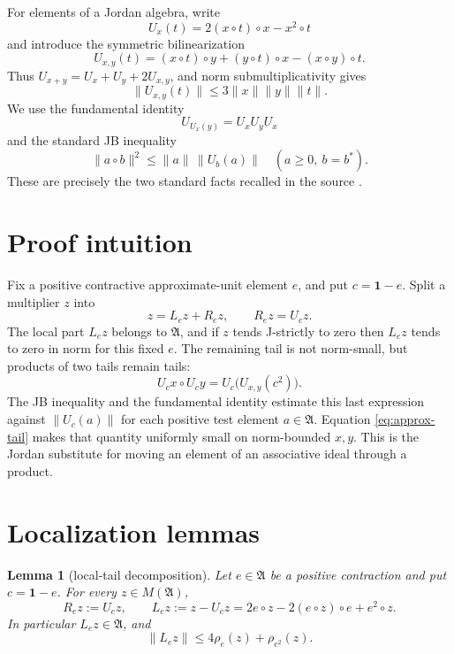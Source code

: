 \documentclass[11pt]{article}
\newtheorem{lemma}[theorem]{Lemma}
\newcommand{\A}{\mathfrak A}
\newcommand{\M}{M(\mathfrak A)}
\newcommand{\one}{\mathbf 1}
\begin{document}
For elements of a Jordan algebra, write
\[
 U_x(t)=2(x\circ t)\circ x-x^2\circ t
\]
and introduce the symmetric bilinearization
\[
 U_{x,y}(t)
 =(x\circ t)\circ y+(y\circ t)\circ x-(x\circ y)\circ t.
\]
Thus \(U_{x+y}=U_x+U_y+2U_{x,y}\), and norm
submultiplicativity gives
\begin{equation}\label{eq:bilinear-bound}
 \lVert U_{x,y}(t)\rVert
 \leq3\lVert x\rVert\lVert y\rVert\lVert t\rVert.
\end{equation}
We use the fundamental identity
\begin{equation}\label{eq:fundamental}
 U_{U_x(y)}=U_xU_yU_x
\end{equation}
and the standard JB inequality
\begin{equation}\label{eq:JB-inequality}
 \lVert a\circ b\rVert^2
 \leq \lVert a\rVert\,\lVert U_b(a)\rVert
 \quad(a\geq0,\ b=b^*).
\end{equation}
These are precisely the two standard facts recalled in the source
\cite{FGLP,HOS}.

\section*{Proof intuition}

Fix a positive contractive approximate-unit element \(e\), and put
\(c=\one-e\). Split a multiplier \(z\) into
\[
 z=L_ez+R_ez,\qquad R_ez=U_cz.
\]
The local part \(L_ez\) belongs to \(\A\), and if \(z\) tends J-strictly to
zero then \(L_ez\) tends to zero in norm for this fixed \(e\). The remaining
tail is not norm-small, but products of two tails remain tails:
\[
 U_cx\circ U_cy=U_c\bigl(U_{x,y}(c^2)\bigr).
\]
The JB inequality and the fundamental identity estimate this last expression
against \(\lVert U_c(a)\rVert\) for each positive test element \(a\in\A\).
Equation \eqref{eq:approx-tail} makes that quantity uniformly small on
norm-bounded \(x,y\). This is the Jordan substitute for moving an element of
an associative ideal through a product.

\section*{Localization lemmas}

\begin{lemma}[local-tail decomposition]\label{lem:decomp}
Let \(e\in\A\) be a positive contraction and put \(c=\one-e\). For every
\(z\in\M\),
\[
 R_ez:=U_cz,\qquad
 L_ez:=z-U_cz
 =2e\circ z-2(e\circ z)\circ e+e^2\circ z.
\]
In particular \(L_ez\in\A\), and
\begin{equation}\label{eq:local-bound}
 \lVert L_ez\rVert
 \leq4\rho_e(z)+\rho_{e^2}(z).
\end{equation}
\end{lemma}
\end{document}
